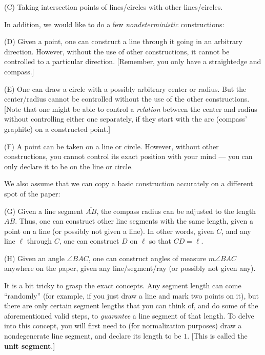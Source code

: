 \documentclass[leqno]{book}
\begin{document}
(C) Taking intersection points of lines/circles with other lines/circles.

In addition, we would like to do a few \emph{nondeterministic} constructions:

(D) Given a point, one can construct a line through it going in an arbitrary direction.  However, without the use of other constructions, it cannot be controlled to a particular direction.  [Remember, you only have a straightedge and compass.] %

(E) One can draw a circle with a possibly arbitrary center or radius.  But the center/radius cannot be controlled without the use of the other constructions.  [Note that one might be able to control a \emph{relation} between the center and radius without controlling either one separately, if they start with the arc (compass' graphite) on a constructed point.]

(F) A point can be taken on a line or circle.  However, without other constructions, you cannot control its exact position with your mind \---- you can only declare it to be on the line or circle.

We also assume that we can copy a basic construction accurately on a different spot of the paper:

(G) Given a line segment $\overline{AB}$, the compass radius can be adjusted to the length $AB$.  Thus, one can construct other line segments with the same length, given a point on a line (or possibly not given a line).  In other words, given $C$, and any line $\ell$ through $C$, one can construct $D$ on $\ell$ so that $CD=\ell$.

(H) Given an angle $\angle BAC$, one can construct angles of measure $m\angle BAC$ anywhere on the paper, given any line/segment/ray (or possibly not given any).

It is a bit tricky to grasp the exact concepts.  Any segment length can come ``randomly'' (for example, if you just draw a line and mark two points on it), but there are only certain segment lengths that you can think of, and do some of the aforementioned valid steps, to \emph{guarantee} a line segment of that length.  To delve into this concept, you will first need to (for normalization purposes) draw a nondegenerate line segment, and declare its length to be $1$.  [This is called the \textbf{unit segment}.]
\end{document}
